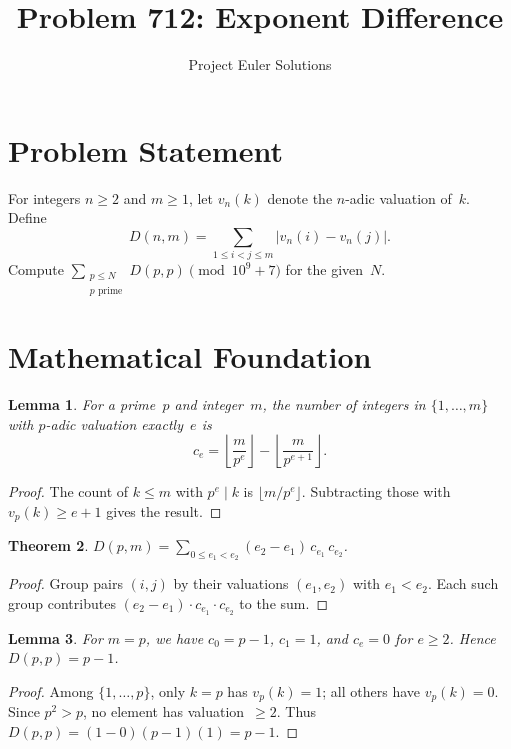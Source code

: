 \documentclass[11pt]{article}
\title{Problem 712: Exponent Difference}
\author{Project Euler Solutions}
\date{}
\newtheorem{theorem}{Theorem}
\newtheorem{lemma}[theorem]{Lemma}
\begin{document}
\maketitle

\section{Problem Statement}

For integers $n \ge 2$ and $m \ge 1$, let $v_n(k)$ denote the $n$-adic valuation of~$k$. Define
\[
D(n,m) = \sum_{1 \le i < j \le m} |v_n(i) - v_n(j)|.
\]
Compute $\displaystyle\sum_{\substack{p \le N \\ p \text{ prime}}} D(p,p) \pmod{10^9+7}$ for the given~$N$.

\section{Mathematical Foundation}

\begin{lemma}
For a prime~$p$ and integer~$m$, the number of integers in $\{1,\ldots,m\}$ with $p$-adic valuation exactly~$e$ is
\[
c_e = \left\lfloor \frac{m}{p^e} \right\rfloor - \left\lfloor \frac{m}{p^{e+1}} \right\rfloor.
\]
\end{lemma}

\begin{proof}
The count of $k \le m$ with $p^e \mid k$ is $\lfloor m/p^e \rfloor$. Subtracting those with $v_p(k) \ge e+1$ gives the result.
\end{proof}

\begin{theorem}
$D(p,m) = \displaystyle\sum_{0 \le e_1 < e_2} (e_2 - e_1)\, c_{e_1}\, c_{e_2}$.
\end{theorem}

\begin{proof}
Group pairs $(i,j)$ by their valuations $(e_1, e_2)$ with $e_1 < e_2$. Each such group contributes $(e_2 - e_1) \cdot c_{e_1} \cdot c_{e_2}$ to the sum.
\end{proof}

\begin{lemma}
For $m = p$, we have $c_0 = p-1$, $c_1 = 1$, and $c_e = 0$ for $e \ge 2$. Hence $D(p,p) = p-1$.
\end{lemma}

\begin{proof}
Among $\{1,\ldots,p\}$, only $k = p$ has $v_p(k) = 1$; all others have $v_p(k) = 0$. Since $p^2 > p$, no element has valuation~$\ge 2$. Thus $D(p,p) = (1-0)(p-1)(1) = p-1$.
\end{proof}
\end{document}
